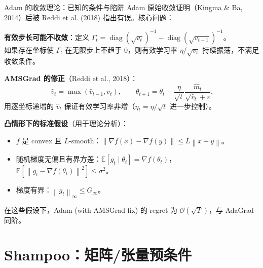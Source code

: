\documentclass[aspectratio=169,10pt]{ctexbeamer}
\newcommand{\E}{\mathbb{E}}
\newcommand{\diag}{\operatorname{diag}}
\newcommand{\eps}{\varepsilon}
\newcommand{\grad}{\nabla}
\newcommand{\norm}[1]{\left\lVert #1 \right\rVert}
\begin{document}
\begin{frame}{Adam 的收敛理论：已知的条件与陷阱}
Adam 原始收敛证明（Kingma \& Ba, 2014）后被 Reddi et al. (2018) 指出有误。核心问题：

\vspace{.2cm}
\textbf{有效步长可能不收敛}：定义 $\Gamma_t=\diag(\sqrt{v_t})^{-1}-\diag(\sqrt{v_{t-1}})^{-1}$。\\
如果存在坐标使 $\Gamma_t$ 在无限步上不趋于 0，则有效学习率 $\eta/\sqrt{v_t}$ 持续振荡，不满足收敛条件。

\vspace{.2cm}
\textbf{AMSGrad 的修正}（Reddi et al., 2018）：
\[
  \hat v_t=\max(\hat v_{t-1},v_t),\qquad
  \theta_{t+1}=\theta_t-\frac{\eta}{\sqrt{t}}\frac{\hat m_t}{\sqrt{\hat v_t}+\eps}.
\]
用逐坐标递增的 $\hat v_t$ 保证有效学习率非增（$\eta_t=\eta/\sqrt{t}$ 进一步控制）。

\vspace{.2cm}
\textbf{凸情形下的标准假设}（用于理论分析）：
\begin{itemize}
  \item $f$ 是 convex 且 $L$-smooth：$\norm{\grad f(x)-\grad f(y)}\le L\norm{x-y}$。
  \item 随机梯度无偏且有界方差：$\E[g_t\mid\theta_t]=\grad f(\theta_t)$，$\E[\norm{g_t-\grad f(\theta_t)}^2]\le\sigma^2$。
  \item 梯度有界：$\norm{g_t}_\infty\le G_\infty$。
\end{itemize}
在这些假设下，Adam (with AMSGrad fix) 的 regret 为 $\mathcal{O}(\sqrt{T})$，与 AdaGrad 同阶。
\end{frame}

\section{Shampoo：矩阵/张量预条件}
\end{document}
